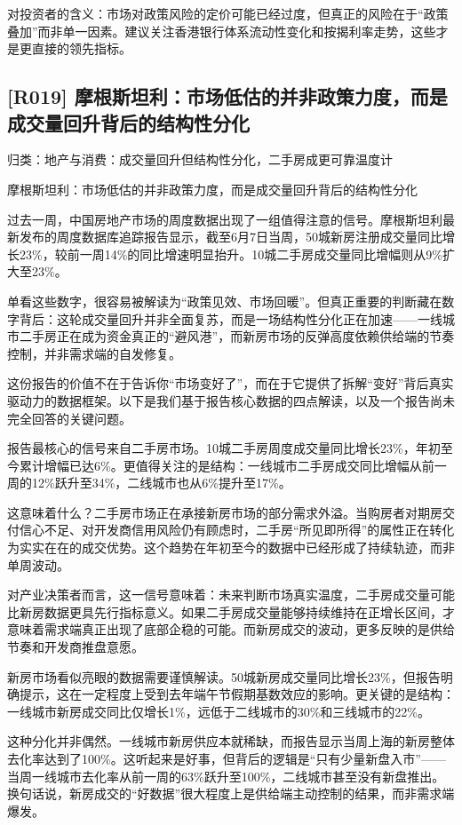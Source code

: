 \documentclass[11pt]{ctexart}
\begin{document}
对投资者的含义：市场对政策风险的定价可能已经过度，但真正的风险在于“政策叠加”而非单一因素。建议关注香港银行体系流动性变化和按揭利率走势，这些才是更直接的领先指标。

\subsection{[R019] 摩根斯坦利：市场低估的并非政策力度，而是成交量回升背后的结构性分化}
{\small\color{refgray}归类：地产与消费：成交量回升但结构性分化，二手房成更可靠温度计}

摩根斯坦利：市场低估的并非政策力度，而是成交量回升背后的结构性分化

过去一周，中国房地产市场的周度数据出现了一组值得注意的信号。摩根斯坦利最新发布的周度数据库追踪报告显示，截至6月7日当周，50城新房注册成交量同比增长23\%，较前一周14\%的同比增速明显抬升。10城二手房成交量同比增幅则从9\%扩大至23\%。

单看这些数字，很容易被解读为“政策见效、市场回暖”。但真正重要的判断藏在数字背后：这轮成交量回升并非全面复苏，而是一场结构性分化正在加速——一线城市二手房正在成为资金真正的“避风港”，而新房市场的反弹高度依赖供给端的节奏控制，并非需求端的自发修复。

这份报告的价值不在于告诉你“市场变好了”，而在于它提供了拆解“变好”背后真实驱动力的数据框架。以下是我们基于报告核心数据的四点解读，以及一个报告尚未完全回答的关键问题。

报告最核心的信号来自二手房市场。10城二手房周度成交量同比增长23\%，年初至今累计增幅已达6\%。更值得关注的是结构：一线城市二手房成交同比增幅从前一周的12\%跃升至34\%，二线城市也从6\%提升至17\%。

这意味着什么？二手房市场正在承接新房市场的部分需求外溢。当购房者对期房交付信心不足、对开发商信用风险仍有顾虑时，二手房“所见即所得”的属性正在转化为实实在在的成交优势。这个趋势在年初至今的数据中已经形成了持续轨迹，而非单周波动。

对产业决策者而言，这一信号意味着：未来判断市场真实温度，二手房成交量可能比新房数据更具先行指标意义。如果二手房成交量能够持续维持在正增长区间，才意味着需求端真正出现了底部企稳的可能。而新房成交的波动，更多反映的是供给节奏和开发商推盘意愿。

新房市场看似亮眼的数据需要谨慎解读。50城新房成交量同比增长23\%，但报告明确提示，这在一定程度上受到去年端午节假期基数效应的影响。更关键的是结构：一线城市新房成交同比仅增长1\%，远低于二线城市的30\%和三线城市的22\%。

这种分化并非偶然。一线城市新房供应本就稀缺，而报告显示当周上海的新房整体去化率达到了100\%。这听起来是好事，但背后的逻辑是“只有少量新盘入市”——当周一线城市去化率从前一周的63\%跃升至100\%，二线城市甚至没有新盘推出。换句话说，新房成交的“好数据”很大程度上是供给端主动控制的结果，而非需求端爆发。
\end{document}
